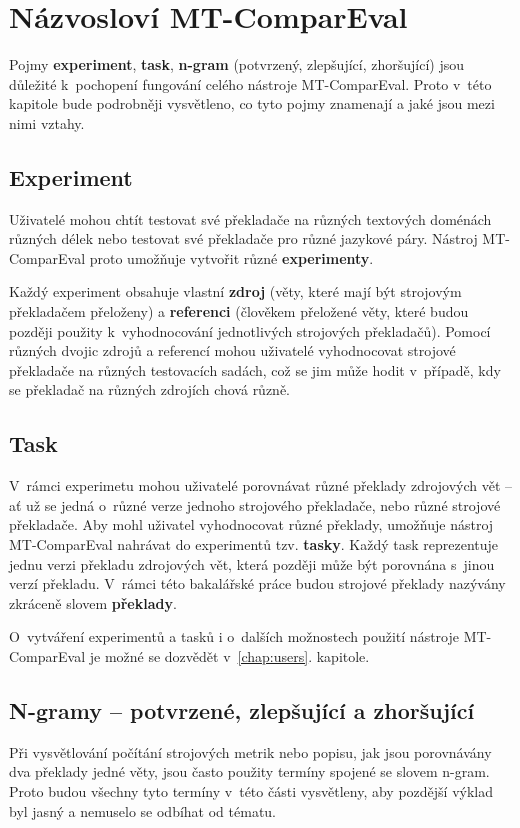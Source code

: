 \chapter{Názvosloví \mbox{MT-ComparEval}}
\label{chap:experiments}

Pojmy \textbf{experiment}, \textbf{task}, \textbf{\mbox{n-gram}} (potvrzený, zlepšující, zhoršující) jsou důležité k~pochopení fungování celého nástroje \mbox{MT-ComparEval}.
Proto v~této kapitole bude podrobněji vysvětleno,
  co tyto pojmy znamenají a jaké jsou mezi nimi vztahy.

\section{Experiment}
Uživatelé mohou chtít testovat své překladače na různých textových doménách různých délek
  nebo testovat své překladače pro různé jazykové páry.
Nástroj \mbox{MT-ComparEval} proto umožňuje vytvořit různé \textbf{experimenty}.

Každý experiment obsahuje vlastní \textbf{zdroj} (věty, které mají být strojovým překladačem přeloženy) a
  \textbf{referenci} (člověkem přeložené věty, které budou později použity k~vyhodnocování jednotlivých strojových překladačů).
Pomocí různých dvojic zdrojů a referencí mohou uživatelé vyhodnocovat strojové překladače na různých testovacích sadách,
  což se jim může hodit v~případě,
  kdy se překladač na různých zdrojích chová různě.

\section{Task}
V~rámci experimetu mohou uživatelé porovnávat různé překlady zdrojových vět --
  ať už se jedná o~různé verze jednoho strojového překladače, nebo různé strojové překladače.
Aby mohl uživatel vyhodnocovat různé překlady,
  umožňuje nástroj \mbox{MT-ComparEval} nahrávat do experimentů tzv. \textbf{tasky}.
Každý task reprezentuje jednu verzi překladu zdrojových vět,
  která později může být porovnána s~jinou verzí překladu.
V~rámci této bakalářské práce budou strojové překlady nazývány zkráceně slovem \textbf{překlady}.

O~vytváření experimentů a tasků i o~dalších možnostech použití nástroje \mbox{MT-ComparEval} je možné se dozvědět v~\ref{chap:users}. kapitole.

\section{N-gramy -- potvrzené, zlepšující a zhoršující}
Při vysvětlování počítání strojových metrik
  nebo popisu, jak jsou porovnávány dva překlady jedné věty,
  jsou často použity termíny spojené se slovem \mbox{n-gram}.
Proto budou všechny tyto termíny v~této části vysvětleny,
  aby pozdější výklad byl jasný a nemuselo se odbíhat od tématu.

